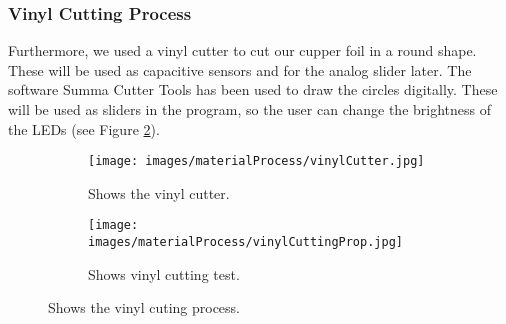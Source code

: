 \documentclass[04.3_buildingProcess.tex]{subfiles}
\begin{document}
    \subsubsection{Vinyl Cutting Process}
    \noindent
    Furthermore, we used a vinyl cutter \cite{vinylCutter}  to cut our cupper foil in a 
    round shape. These will be used as capacitive sensors and for the analog slider later. The software 
    Summa Cutter Tools \cite{SoftwareSumma} has been used to draw the circles digitally. These will be used as sliders in the 
    program, so the user can change the brightness of the LEDs (see Figure \ref{fig:vinylCuttingProp}).

    \begin{figure}[H]
        \centering
        \begin{subfigure}{.45\textwidth}
            \centering
            \texttt{[image: images/materialProcess/vinylCutter.jpg]}
            \caption{Shows the vinyl cutter.}
            \label{fig:vinylCutter}
            \vspace{6mm}
        \end{subfigure}
        \medskip
        \hspace{1mm}
        \begin{subfigure}{.45\textwidth}
            \centering
            \texttt{[image: images/materialProcess/vinylCuttingProp.jpg]}
            \caption{Shows vinyl cutting test.}
            \label{fig:vinylCuttingProp}
            \vspace{6mm}
        \end{subfigure}
        \caption{Shows the vinyl cuting process.}
        \label{fig:laserCutTests}
    \end{figure}
\end{document}
